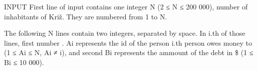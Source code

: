 INPUT
First line of input contains one integer N (2 ≤ N ≤ 200 000), number of inhabitants of Križ. They are numbered from 1 to N.  

   The following N lines contain two integers, separated by space. In i.th of those lines, first number . Ai represents the id of the person  i.th person owes money to (1 ≤  Ai  ≤ N,  Ai  ≠  i), and second  Bi represents the ammount of the debt in \$ (1 ≤ Bi  ≤ 10 000).